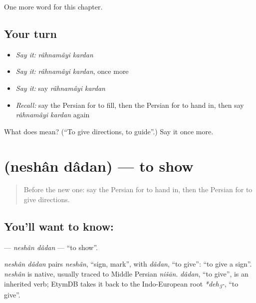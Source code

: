 \begin{grammarlens}[title={What you've built}]
One more word for this chapter.
\end{grammarlens}

\subsection*{Your turn}
\begin{itemize}
\raggedright
  \item \emph{Say it:} \emph{râhnamâyi kardan}
  \item \emph{Say it:} \emph{râhnamâyi kardan}, once more
  \item \emph{Say it:} say \emph{râhnamâyi kardan}
  \item \emph{Recall:} say the Persian for to fill, then the Persian for to hand in, then say \emph{râhnamâyi kardan} again
\end{itemize}

\begin{tcolorbox}[breakable,colback=teal!4,colframe=teal!35!black,title={Before you move on}]
What does   mean? (\textquotedblleft{}To give directions, to guide\textquotedblright{}.) Say it once more.
\end{tcolorbox}
\section[\texorpdfstring{\fa{نشان} \fa{دادن} (neshân dâdan)}{نشان دادن (neshân dâdan)}]{  (neshân dâdan) — to show}

\label{lesson:FA-C144-neshan-dadan}



\begin{quote}
Before the new one: say the Persian for to hand in, then the Persian for to give directions.
\end{quote}

\subsection*{You'll want to know:  }
\textbf{ } — \emph{neshân dâdan} — \textquotedblleft{}to show\textquotedblright{}.

\begin{cousinweb}
\emph{neshân dâdan} pairs \emph{neshân}, \textquotedblleft{}sign, mark\textquotedblright{}, with \emph{dâdan}, \textquotedblleft{}to give\textquotedblright{}: \textquotedblleft{}to give a sign\textquotedblright{}. \emph{neshân} is native, usually traced to Middle Persian \emph{nišān}. \emph{dâdan}, \textquotedblleft{}to give\textquotedblright{}, is an inherited verb; EtymDB takes it back to the Indo-European root \emph{*deh\textsubscript{3}-}, \textquotedblleft{}to give\textquotedblright{}.
\end{cousinweb}

